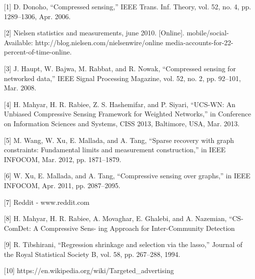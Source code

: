 \documentclass{article}
\begin{document}
[1] D. Donoho, “Compressed sensing,” IEEE Trans. Inf. Theory, vol. 52,
no. 4, pp. 1289–1306, Apr. 2006.

[2] Nielsen statistics and measurements, june 2010. [Online].
mobile/social-
Available: http://blog.nielsen.com/nielsenwire/online
media-accounts-for-22-percent-of-time-online.

[3] J. Haupt, W. Bajwa, M. Rabbat, and R. Nowak, “Compressed sensing
for networked data,” IEEE Signal Processing Magazine, vol. 52, no. 2,
    pp. 92–101, Mar. 2008.

[4] H. Mahyar, H. R. Rabiee, Z. S. Hashemifar, and P. Siyari, “UCS-WN: An
Unbiased Compressive Sensing Framework for Weighted Networks,” in
Conference on Information Sciences and Systems, CISS 2013, Baltimore,
USA, Mar. 2013.

[5] M. Wang, W. Xu, E. Mallada, and A. Tang, “Sparse recovery with graph
constraints: Fundamental limits and measurement construction,” in IEEE
INFOCOM, Mar. 2012, pp. 1871–1879.

[6] W. Xu, E. Mallada, and A. Tang, “Compressive sensing over graphs,”
in IEEE INFOCOM, Apr. 2011, pp. 2087–2095.

[7] Reddit - www.reddit.com

[8] H. Mahyar, H. R. Rabiee, A. Movaghar, E. Ghalebi,
and A. Nazemian, “CS-ComDet: A Compressive Sens-
ing Approach for Inter-Community Detection

[9] R. Tibshirani, “Regression shrinkage and selection via
the lasso,” Journal of the Royal Statistical Society B,
vol. 58, pp. 267–288, 1994.

[10] https://en.wikipedia.org/wiki/Targeted\_advertising
\end{document}
